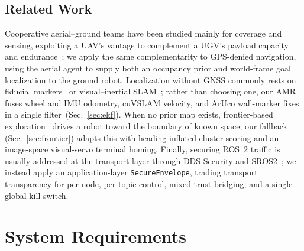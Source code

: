 \documentclass[conference]{IEEEtran}
\begin{document}
\subsection{Related Work}
Cooperative aerial--ground teams have been studied mainly for coverage and
sensing, exploiting a UAV's vantage to complement a UGV's payload capacity and
endurance~\cite{tokekar}; we apply the same complementarity to GPS-denied
navigation, using the aerial agent to supply both an occupancy prior and
world-frame goal localization to the ground robot. Localization without GNSS
commonly rests on fiducial markers~\cite{aruco} or visual--inertial
SLAM~\cite{cuvslam}; rather than choosing one, our AMR fuses wheel and IMU
odometry, cuVSLAM velocity, and ArUco wall-marker fixes in a single
filter~(Sec.~\ref{sec:ekf}). When no prior map exists, frontier-based
exploration~\cite{yamauchi} drives a robot toward the boundary of known space;
our fallback (Sec.~\ref{sec:frontier}) adapts this with heading-inflated cluster
scoring and an image-space visual-servo terminal homing. Finally, securing ROS~2
traffic is usually addressed at the transport layer through DDS-Security and
SROS2~\cite{diluoffo}; we instead apply an application-layer
\texttt{SecureEnvelope}, trading transport transparency for per-node, per-topic
control, mixed-trust bridging, and a single global kill switch.

\section{System Requirements}
\label{sec:requirements}
\end{document}
